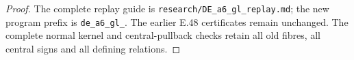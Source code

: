 \begin{proof}
The complete replay guide is
\texttt{research/DE\_a6\_gl\_replay.md}; the new program
prefix is \texttt{de\_a6\_gl\_}.  The earlier E.48
certificates remain unchanged.  The complete normal
kernel and central-pullback checks retain all old fibres,
all central signs and all defining relations.
\end{proof}
